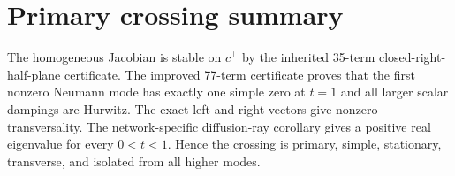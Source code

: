\section*{Primary crossing summary}
The homogeneous Jacobian is stable on $c^\perp$ by the inherited 35-term
closed-right-half-plane certificate.  The improved 77-term certificate proves
that the first nonzero Neumann mode has exactly one simple zero at $t=1$ and
all larger scalar dampings are Hurwitz.  The exact left and right vectors give
nonzero transversality.  The network-specific diffusion-ray corollary gives a positive real
eigenvalue for every $0<t<1$.  Hence the crossing is primary, simple,
stationary, transverse, and isolated from all higher modes.
